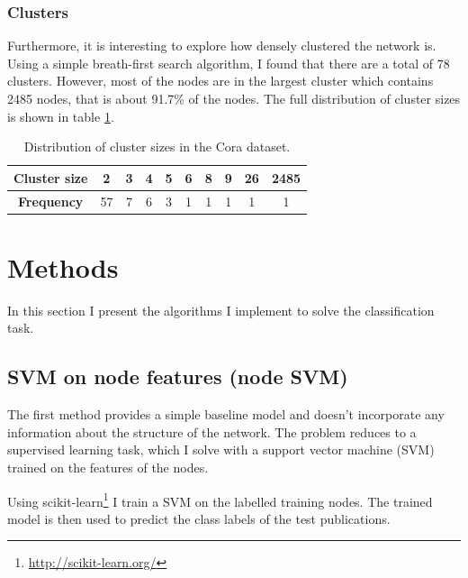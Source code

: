 \documentclass[12pt]{article}
\theoremstyle{definition}
\begin{document}
\subsubsection{Clusters}
Furthermore, it is interesting to explore how densely clustered the network is. Using a simple breath-first search algorithm, I found that there are a total of 78 clusters. However, most of the nodes are in the largest cluster which contains 2485 nodes, that is about 91.7\% of the nodes. The full distribution of cluster sizes is shown in table \ref{table/cluster_sizes}.
\begin{table}[h]
\centering	
{\renewcommand{\arraystretch}{1.4} %
\begin{tabular}{ c | c c c c c c c c c}
\textbf{Cluster size} & 2  & 3 & 4 & 5 & 6 & 8 & 9 & 26 & 2485 \\
\hline
\textbf{Frequency} 	  & 57 & 7 & 6 & 3 & 1 & 1 & 1 & 1  & 1 \\
\end{tabular}
}
\caption{Distribution of cluster sizes in the Cora dataset.}
\label{table/cluster_sizes}
\end{table}


\section{Methods}
In this section I present the algorithms I implement to solve the classification task.

\subsection{SVM on node features (node SVM)}
The first method provides a simple baseline model and doesn't incorporate any information about the structure of the network. The problem reduces to a supervised learning task, which I solve with a support vector machine (SVM) trained on the features of the nodes.
\bigskip

Using scikit-learn\footnote{\url{http://scikit-learn.org/}} \cite{scikit-learn} I train a SVM on the labelled training nodes. The trained model is then used to predict the class labels of the test publications.
\end{document}
